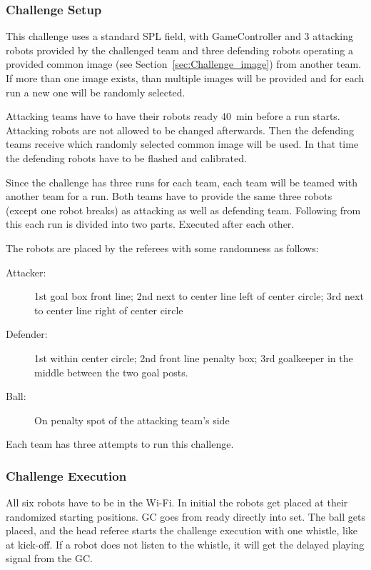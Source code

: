     \subsubsection{Challenge Setup}

        This challenge uses a standard SPL field, with GameController and 3 attacking robots provided by the challenged team and three defending robots operating a provided common image (see Section~\ref{sec:Challenge_image}) from another team. If more than one image exists, than multiple images will be provided and for each run a new one will be randomly selected.

        Attacking teams have to have their robots ready \qty{40}{\minute} before a run starts. Attacking robots are not allowed to be changed afterwards. Then the defending teams receive which randomly selected common image will be used. In that time the defending robots have to be flashed and calibrated.

        Since the challenge has three runs for each team, each team will be teamed with another team for a run. Both teams have to provide the same three robots (except one robot breaks) as attacking as well as defending team. Following from this each run is divided into two parts. Executed after each other.


    The robots are placed by the referees with some randomness as follows:

    \begin{description}
        \item[Attacker:] 1st goal box front line; 2nd next to center line left of center circle; 3rd next to center line right of center circle
        \item[Defender:] 1st within center circle; 2nd front line penalty box; 3rd goalkeeper in the middle between the two goal posts.
        \item[Ball:] On penalty spot of the attacking team's side
    \end{description}

    Each team has three attempts to run this challenge.

    \subsubsection{Challenge Execution}

    All six robots have to be in the Wi-Fi. In initial the robots get placed at their randomized starting positions. GC goes from ready directly into set. The ball gets placed, and the head referee starts the challenge execution with one whistle, like at kick-off. If a robot does not listen to the whistle, it will get the delayed playing signal from the GC.

